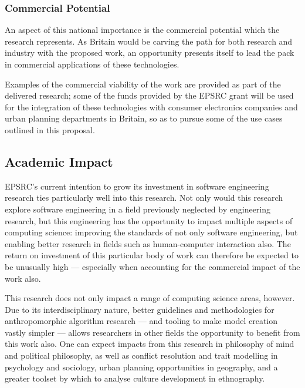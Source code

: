 \subsubsection{Commercial Potential}
An aspect of this national importance is the commercial potential which the research represents. As Britain would be carving the path for both research and industry with the proposed work, an opportunity presents itself to lead the pack in commercial applications of these technologies.\par

Examples of the commercial viability of the work are provided as part of the delivered research; some of the funds provided by the EPSRC grant will be used for the integration of these technologies with consumer electronics companies and urban planning departments in Britain, so as to pursue some of the use cases outlined in this proposal.\par

\subsection{Academic Impact}
\label{sec:academic_impact}
EPSRC's current intention to grow its investment in software engineering research ties particularly well into this research. Not only would this research explore software engineering in a field previously neglected by engineering research, but this engineering has the opportunity to impact multiple aspects of computing science: improving the standards of not only software engineering, but enabling better research in fields such as human-computer interaction also. The return on investment of this particular body of work can therefore be expected to be unusually high --- especially when accounting for the commercial impact of the work also.\par

This research does not only impact a range of computing science areas, however. Due to its interdisciplinary nature, better guidelines and methodologies for anthropomorphic algorithm research --- and tooling to make model creation vastly simpler --- allows researchers in other fields the opportunity to benefit from this work also. One can expect impacts from this research in philosophy of mind and political philosophy, as well as conflict resolution and trait modelling in psychology and sociology, urban planning opportunities in geography, and a greater toolset by which to analyse culture development in ethnography. 

\let\oldbibliography\thebibliography
\renewcommand{\thebibliography}[1]{\oldbibliography{#1}
\setlength{\itemsep}{-3pt}}


{
\scriptsize

}

